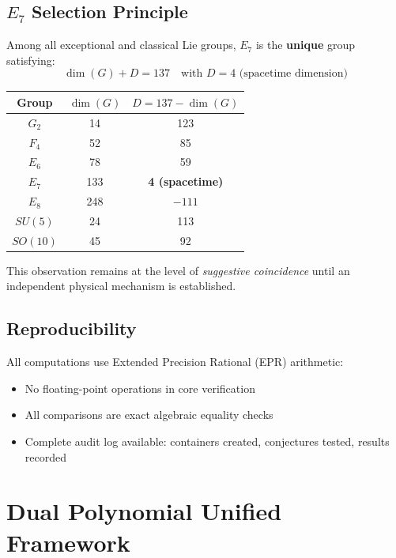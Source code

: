 \documentclass[11pt,a4paper]{article}
\begin{document}
\subsection{$E_7$ Selection Principle}

Among all exceptional and classical Lie groups, $E_7$ is the \textbf{unique} group satisfying:
\[
\dim(G) + D = 137 \quad \text{with } D = 4 \text{ (spacetime dimension)}
\]

\begin{center}
\begin{tabular}{ccc}
Group & $\dim(G)$ & $D = 137 - \dim(G)$ \\
\hline
$G_2$ & 14 & 123 \\
$F_4$ & 52 & 85 \\
$E_6$ & 78 & 59 \\
$E_7$ & 133 & \textbf{4 (spacetime)} \\
$E_8$ & 248 & $-111$ \\
$SU(5)$ & 24 & 113 \\
$SO(10)$ & 45 & 92 \\
\end{tabular}
\end{center}

This observation remains at the level of \textit{suggestive coincidence} until an independent physical mechanism is established.

\subsection{Reproducibility}

All computations use Extended Precision Rational (EPR) arithmetic:
\begin{itemize}
    \item No floating-point operations in core verification
    \item All comparisons are exact algebraic equality checks
    \item Complete audit log available: containers created, conjectures tested, results recorded
\end{itemize}

\section{Dual Polynomial Unified Framework}
\end{document}
